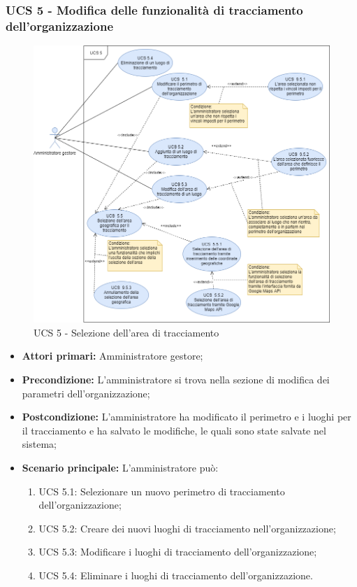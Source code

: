 \subsubsection{UCS 5 - Modifica delle funzionalità di tracciamento dell'organizzazione}%
\begin{figure}[h]
	\centering
    \includegraphics[scale=0.53]{sezioni/UseCase/Immagini/UCS5.png}
    \caption{UCS 5 - Selezione dell'area di tracciamento}
\end{figure}
\begin{itemize}
    \item \textbf{Attori primari:} Amministratore gestore;
    \item \textbf{Precondizione:} L'amministratore si trova nella sezione di modifica dei parametri dell'organizzazione;
    \item \textbf{Postcondizione:} L'amministratore ha modificato il perimetro e i luoghi per il tracciamento e ha salvato le modifiche, le quali sono state salvate nel sistema;
    \item \textbf{Scenario principale:} L'amministratore può:
    \begin{enumerate}
        \item UCS 5.1: Selezionare un nuovo perimetro di tracciamento dell'organizzazione;
        \item UCS 5.2: Creare dei nuovi luoghi di tracciamento nell'organizzazione;
        \item UCS 5.3: Modificare i luoghi di tracciamento dell'organizzazione;
        \item UCS 5.4: Eliminare i luoghi di tracciamento dell'organizzazione.
    \end{enumerate}
\end{itemize}

